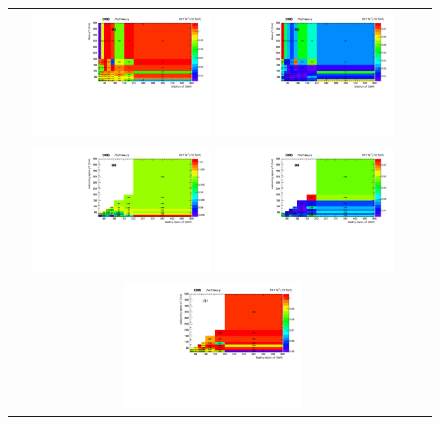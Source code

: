 \begin{figure}[!htb]
  \begin{center}
    \begin{tabular}{cc}
      \includegraphics[width=0.45\textwidth]{fig_2016preVFP_TrigSF/h2D_lepABpt_emu.pdf}
      \includegraphics[width=0.45\textwidth]{fig_2016preVFP_TrigSF/h2D_lepABpt_emu_BinErrors.pdf}\\       
      \includegraphics[width=0.45\textwidth]{fig_2016preVFP_TrigSF/h2D_lepABpt_ee.pdf}
      \includegraphics[width=0.45\textwidth]{fig_2016preVFP_TrigSF/h2D_lepABpt_ee_BinErrors.pdf}\\
      \includegraphics[width=0.45\textwidth]{fig_2016preVFP_TrigSF/h2D_lepABpt_mumu.pdf}

\end{tabular}
\end{center}
\end{figure}
